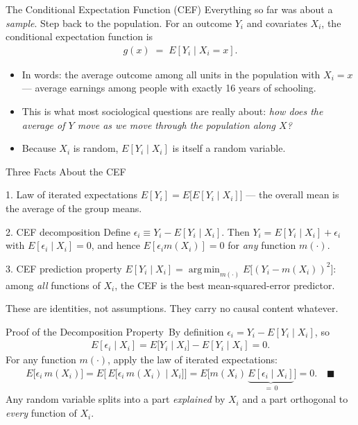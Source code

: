 \documentclass[aspectratio=169,11pt,xcolor=dvipsnames]{beamer}
\DeclareMathOperator*{\argmin}{arg\,min}
\newcommand{\E}{E}
\newcommand{\adv}{\,\raisebox{0.6pt}{\textcolor{accent}{$\bigstar$}}}
\begin{document}
\begin{frame}{The Conditional Expectation Function (CEF)}
Everything so far was about a \emph{sample}. Step back to the population.
\vskip4pt
For an outcome $Y_i$ and covariates $X_i$, the \alert{conditional expectation
function} is
\begin{align*}
  g(x) \;=\; \E[Y_i \mid X_i = x] .
\end{align*}
\begin{itemize}\itemsep4pt
  \item In words: the average outcome among all units in the population with
        $X_i = x$ --- average earnings among people with exactly 16 years of
        schooling.
  \item This is what most sociological questions are really about: \emph{how does
        the average of $Y$ move as we move through the population along $X$?}
  \item Because $X_i$ is random, $\E[Y_i\mid X_i]$ is itself a random variable.
\end{itemize}
\end{frame}

\begin{frame}{Three Facts About the CEF}
\begin{block}{1. Law of iterated expectations}
$\E[Y_i] = \E\big[\E[Y_i\mid X_i]\big]$ --- the overall mean is the average of
the group means.
\end{block}
\pause
\begin{block}{2. CEF decomposition}
Define $\epsilon_i \equiv Y_i - \E[Y_i\mid X_i]$. Then $Y_i = \E[Y_i\mid X_i] + \epsilon_i$
with $\E[\epsilon_i\mid X_i] = 0$, and hence $\E[\epsilon_i m(X_i)] = 0$ for
\emph{any} function $m(\cdot)$.
\end{block}
\pause
\begin{block}{3. CEF prediction property}
$\E[Y_i\mid X_i] = \argmin_{m(\cdot)} \E\big[(Y_i - m(X_i))^2\big]$: among
\emph{all} functions of $X_i$, the CEF is the best mean-squared-error predictor.
\end{block}
\vskip2pt
\alert{These are identities, not assumptions.} They carry no causal content
whatever.
\end{frame}

\begin{frame}{Proof of the Decomposition Property\adv}
By definition $\epsilon_i = Y_i - \E[Y_i\mid X_i]$, so
\begin{align*}
  \E[\epsilon_i \mid X_i]
  = \E\big[Y_i \mid X_i\big] - \E[Y_i\mid X_i] = 0 .
\end{align*}
For any function $m(\cdot)$, apply the law of iterated expectations:
\begin{align*}
  \E\big[\epsilon_i\, m(X_i)\big]
  = \E\Big[\, \E\big[\epsilon_i\, m(X_i) \mid X_i \big] \Big]
  = \E\Big[ m(X_i)\, \underbrace{\E[\epsilon_i \mid X_i]}_{=\,0} \Big]
  = 0 . \quad\blacksquare
\end{align*}
\vskip4pt
Any random variable splits into a part \emph{explained} by $X_i$ and a part
orthogonal to \emph{every} function of $X_i$.
\end{frame}
\end{document}
